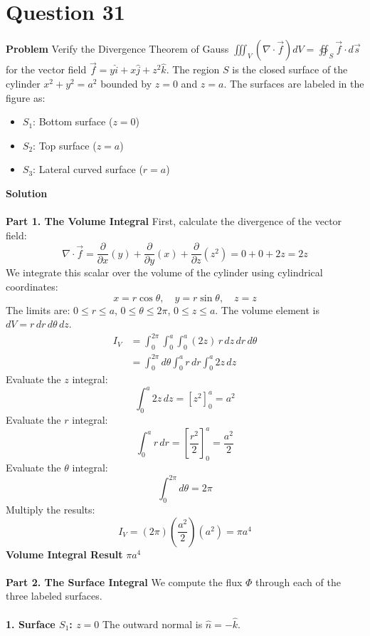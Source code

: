 \documentclass{article}
\begin{document}
\pagebreak


\section{Question 31}
\textbf{Problem}
Verify the Divergence Theorem of Gauss
$\iiint_V (\nabla \cdot \vec{f}) dV = \oiint_S \vec{f} \cdot d\vec{s}$ for the
vector field $\vec{f} = y\hat{i} + x\hat{j} + z^2\hat{k}$. The region $S$ is the
closed surface of the cylinder $x^2 + y^2 = a^2$ bounded by $z=0$ and $z=a$. The
surfaces are labeled in the figure as:
\begin{itemize}
	\item $S_1$: Bottom surface ($z=0$)
	\item $S_2$: Top surface ($z=a$)
	\item $S_3$: Lateral curved surface ($r=a$)
\end{itemize}
\textbf{Solution}
\\
\\
\textbf{Part 1. The Volume Integral}
First, calculate the divergence of the vector field:
\[
	\nabla \cdot \vec{f} = \frac{\partial}{\partial x}(y) + \frac{\partial}{\partial y}(x) + \frac{\partial}{\partial z}(z^2) = 0 + 0 + 2z = 2z
\]
We integrate this scalar over the volume of the cylinder using cylindrical
coordinates:
\[ x = r\cos\theta, \quad y = r\sin\theta, \quad z = z \]
The limits are: $0 \le r \le a$, $0 \le \theta \le 2\pi$, $0 \le z \le a$.
The volume element is $dV = r \, dr \, d\theta \, dz$.
\begin{align*}
	I_V & = \int_0^{2\pi} \int_0^a \int_0^a (2z) \, r \, dz \, dr \, d\theta \\
	    & = \int_0^{2\pi} d\theta \int_0^a r \, dr \int_0^a 2z \, dz
\end{align*}
Evaluate the $z$ integral:
\[ \int_0^a 2z \, dz = [z^2]_0^a = a^2 \]
Evaluate the $r$ integral:
\[ \int_0^a r \, dr = \left[\frac{r^2}{2}\right]_0^a = \frac{a^2}{2} \]
Evaluate the $\theta$ integral:
\[ \int_0^{2\pi} d\theta = 2\pi \]
Multiply the results:
\[
	I_V = (2\pi) \left( \frac{a^2}{2} \right) (a^2) = \pi a^4
\]
\textbf{Volume Integral Result} $\pi a^4$
\\
\\
\textbf{Part 2. The Surface Integral}
We compute the flux $\Phi$ through each of the three labeled surfaces.
\\
\\
\textbf{1. Surface $S_1$: $z=0$}
The outward normal is $\hat{n} = -\hat{k}$.
\end{document}
